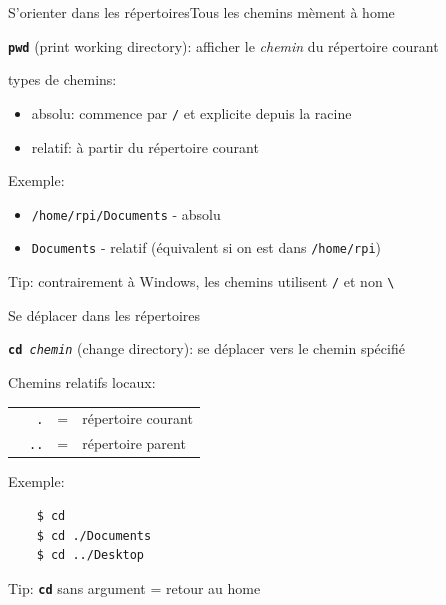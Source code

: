 \documentclass[
aspectratio=169 %
]{beamer}
\newcommand{\cmd}[1]{\texttt{\textbf{#1}}}
\newcommand{\args}[1]{\texttt{\textit{#1}}}
\begin{document}
\begin{frame}{S'orienter dans les répertoires}{Tous les chemins mèment à home}

    \cmd{pwd} (print working directory): afficher le \textit{chemin} du
    répertoire courant

     types de chemins:
    \begin{itemize}
        \item absolu: commence par \texttt{/} et explicite depuis la racine
        \item relatif: à partir du répertoire courant
    \end{itemize}

    \bigskip Exemple:
    \begin{itemize}
        \item \texttt{/home/rpi/Documents} - absolu
        \item \texttt{Documents} - relatif (équivalent si on est dans
              \texttt{/home/rpi})
    \end{itemize}

    \bigskip \alert{Tip:} contrairement à Windows, les chemins utilisent
    \texttt{/} et non \texttt{\textbackslash}

\end{frame}

\begin{frame}[fragile]{Se déplacer dans les répertoires}

    \cmd{cd}\args{ chemin} (change directory): se déplacer
    vers le chemin spécifié

    \bigskip
    Chemins relatifs locaux:

    \bigskip
    \begin{tabular}{rrll}
         & \texttt{.}  & = & répertoire courant \\
         & \texttt{..} & = & répertoire parent
    \end{tabular}

    \bigskip
    Exemple:

    \begin{lstlisting}
    $ cd
    $ cd ./Documents
    $ cd ../Desktop
    \end{lstlisting}

    \bigskip
    \alert{Tip:} \cmd{cd} sans argument = retour au home

\end{frame}
\end{document}
